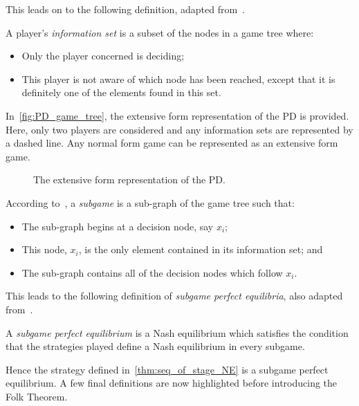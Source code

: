 This leads on to the following definition, adapted from~\cite{Webb2007}.

\begin{definition}
    A player's \textit{information set} is a subset of the nodes in a game tree
    where:
    \begin{itemize}
        \item Only the player concerned is deciding;
        \item This player is not aware of which node has been reached, except
        that it is definitely one of the elements found in this set.
    \end{itemize}     
\end{definition}

In~\autoref{fig:PD_game_tree}, the extensive form representation of the
PD is provided. Here, only two players are considered and
any information sets are represented by a dashed line. Any normal form
game can be represented as an extensive form game. 

\begin{figure}
    \centering
    
    \caption{The extensive form representation of the PD.}\label{fig:PD_game_tree}
\end{figure}

\begin{definition}
According to~\cite{Webb2007}, a \textit{subgame} is a sub-graph of the game tree
such that:
\begin{itemize}
    \item The sub-graph begins at a decision node, say \(x_{i}\);
    \item This node, \(x_{i}\), is the only element contained in its information
    set; and
    \item The sub-graph contains all of the decision nodes which follow \(x_{i}\).
\end{itemize}   
\end{definition}

This leads to the following definition of \textit{subgame perfect equilibria},
also adapted from~\cite{Webb2007}.

\begin{definition}
    A \textit{subgame perfect equilibrium} is a Nash equilibrium which satisfies
    the condition that the strategies played define a Nash equilibrium in every
    subgame.
\end{definition}

Hence the strategy defined in~\autoref{thm:seq_of_stage_NE} is a subgame
perfect equilibrium. A few final definitions are now highlighted before
introducing the Folk Theorem.

